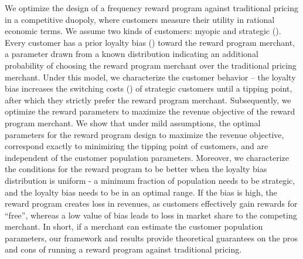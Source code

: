 We optimize the design of a frequency reward program against traditional pricing in a competitive duopoly, where customers measure their utility in rational economic terms.
We assume two kinds of customers: myopic and strategic (\cite{yilmaz2016upgrade}). 
Every customer has a prior loyalty bias (\cite{fader1993excess}) toward the reward program merchant, a parameter drawn from a known distribution indicating an additional probability of choosing the reward program merchant over the traditional pricing merchant.
Under this model, we characterize the customer behavior -- the loyalty bias increases the switching costs (\cite{klemperer1995competition}) of strategic customers until a tipping point, after which they strictly prefer the reward program merchant. 
Subsequently, we optimize the reward parameters to maximize the revenue objective of the reward program merchant.
We show that under mild assumptions, the optimal parameters for the reward program design to maximize the revenue objective, correspond exactly to minimizing the tipping point of customers, and are independent of the customer population parameters. 
Moreover, we characterize the conditions for the reward program to be better when the loyalty bias distribution is uniform - a minimum fraction of population needs to be strategic, and the loyalty bias needs to be in an optimal range.
If the bias is high, the reward program creates loss in revenues, as customers effectively gain rewards for ``free'', whereas a low value of bias leads to loss in market share to the competing merchant.
In short, if a merchant can estimate the customer population parameters, our framework and results provide theoretical guarantees on the pros and cons of running a reward program against traditional pricing.
